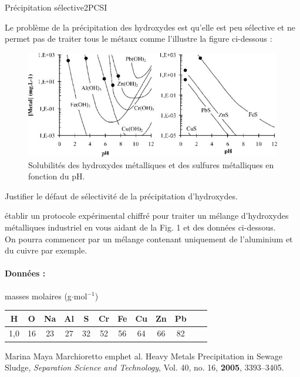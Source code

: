 \begin{exercise}{Précipitation sélective}{2}{PCSI}
\begin{questions}
\begin{EnvUplevel}
    Le problème de la précipitation des hydroxydes est qu'elle est peu sélective et ne permet pas de traiter tous le métaux comme l'illustre la figure ci-dessous : \vspace{-.4em}
    
    \begin{figure}[H]
        \centering
        \includegraphics[width=.9\linewidth]{chimie/precipitation/precipitation_selective.png}
        \caption{Solubilités des hydroxydes métalliques et des sulfures métalliques en fonction du pH.}
    \end{figure}
\end{EnvUplevel}

\question Justifier le défaut de sélectivité de la précipitation d'hydroxydes.

 établir un protocole expérimental chiffré pour traiter un mélange d'hydroxydes métalliques industriel en vous aidant de la Fig. 1 et des données ci-dessous. \\
On pourra commencer par un mélange contenant uniquement de l'aluminium et du cuivre par exemple.

\end{questions}

\paragraph{Données :} masses molaires (g$\cdot$mol$^{-1}$) \vspace{-1em}

\begin{table}[H]
    \centering
    \begin{tabularx}{0.8\linewidth}{CCCCCCCCCCCC}
        H   & O  & Na & Al & S  & Cr & Fe & Cu & Zn & Pb \\ ,0 & 16 & 23 & 27 & 32 & 52 & 56 & 64 & 66 & 82 \\ \hline\hline
    \end{tabularx}
\end{table}

\plusloin Marina Maya Marchioretto emph{et al.} Heavy Metals
Precipitation in Sewage Sludge, \textit{Separation Science and Technology}, Vol. 40, no. 16, \textbf{2005}, 3393--3405. \vspace{-.5em}
\end{exercise}

